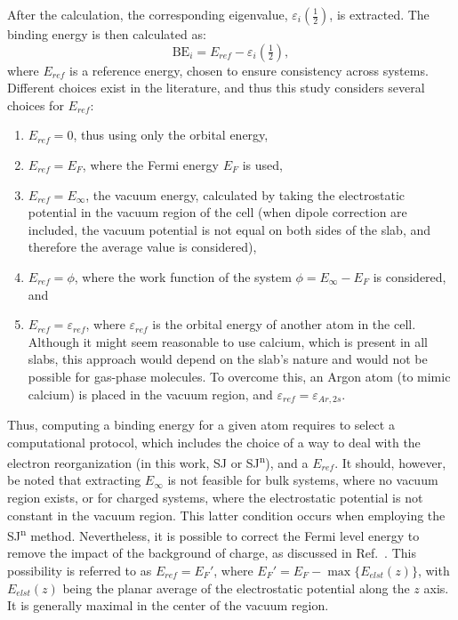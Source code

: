 \documentclass[%
aip,
amsmath,amssymb,
preprint,%
jcp,
showkeys,
]{revtex4-2}
\begin{document}
After the calculation, the corresponding eigenvalue, $\varepsilon_i\left(\frac{1}{2}\right)$, is extracted. The binding energy is then calculated as:
\begin{equation}
	\text{BE}_i = 
	E_{ref}- \varepsilon_i\left(\tfrac{1}{2}\right), \label{eq:xpsbe}
\end{equation}
where $E_{ref}$ is a reference energy, chosen to ensure consistency across systems. Different choices exist in the literature, and thus this study considers several choices for $E_{ref}$:
\begin{enumerate}
	\item $E_{ref}=0$, thus using only the orbital energy,
	\item $E_{ref}=E_F$, where the Fermi energy $E_F$ is used, 
	\item $E_{ref}=E_\infty$, the vacuum energy, calculated by taking the electrostatic potential in the vacuum region of the cell (when dipole correction are included, the vacuum potential is not equal on both sides of the slab, and therefore the average value is considered),
	\item $E_{ref}=\phi$, where the work function of the system $\phi = E_\infty - E_F$ is considered\cite{kahnFermiLevelWork2015}, and
	\item $E_{ref}= \varepsilon_{ref}$, where $\varepsilon_{ref}$ is the orbital energy of another atom in the cell. Although it might seem reasonable to use calcium, which is present in all slabs, this approach would depend on the slab's nature and would not be possible for gas-phase molecules. To overcome this, an Argon atom (to mimic calcium) is placed in the vacuum region, and $\varepsilon_{ref}=\varepsilon_{Ar,2s}$.
\end{enumerate}
Thus, computing a binding energy for a given atom requires to select a computational protocol, which includes the choice of a  way to deal with the electron reorganization  (in this work, SJ or SJ\textsuperscript{n}), and a $E_{ref}$.
It should, however, be noted that extracting $E_\infty$ is not feasible for bulk systems, where no vacuum region exists, or for charged systems, where the electrostatic potential is not constant in the vacuum region. This latter condition occurs when employing the SJ\textsuperscript{n} method. Nevertheless, it is possible to correct the Fermi level energy to remove the impact of the background of charge, as discussed in Ref.~. This possibility is referred to as $E_{ref}=E_F'$, where $E_F' = E_F - \max\{E_{elst}(z)\}$, with $E_{elst}(z)$ being the planar average of the electrostatic potential along the $z$ axis. It is generally maximal in the center of the vacuum region.
\end{document}
